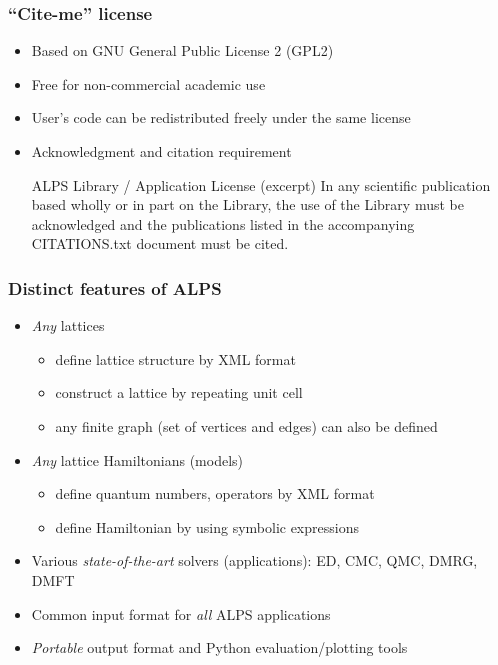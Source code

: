 \begin{frame}[t,fragile]
\frametitle{``Cite-me'' license}
  \begin{itemize}
  \item Based on GNU General Public License 2 (GPL2)
  \item Free for non-commercial academic use
  \item User's code can be redistributed freely under the same license
  \item Acknowledgment and citation requirement
    \begin{minipage}{.9\textwidth}
    \begin{block}{ALPS Library / Application License (excerpt)}
      In any scientific publication based wholly or in part on the
      Library, the use of the Library must be acknowledged and the
      publications listed in the accompanying CITATIONS.txt document
      must be cited.
    \end{block}
    \end{minipage}
  \end{itemize}
\end{frame}

\begin{frame}[t,fragile]
  \frametitle{Distinct features of ALPS}
  \begin{itemize}
  \item {\em \color{red} Any} lattices
    \begin{itemize}
    \item define lattice structure by XML format
    \item construct a lattice by repeating unit cell
    \item any finite graph (set of vertices and edges) can also be defined
    \end{itemize}
  \item {\em \color{red} Any} lattice Hamiltonians (models)
    \begin{itemize}
    \item define quantum numbers, operators by XML format
    \item define Hamiltonian by using symbolic expressions
    \end{itemize}
  \item Various {\em \color{red} state-of-the-art} solvers (applications): ED, CMC, QMC, DMRG, DMFT
  \item Common input format for {\em \color{red} all} ALPS applications
  \item {\em \color{red} Portable} output format and Python evaluation/plotting tools
  \end{itemize}
\end{frame}

